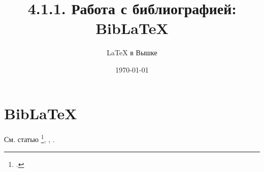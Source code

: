 \documentclass[a4paper,12pt]{article}
\author{\LaTeX{} в Вышке}
\title{4.1.1. Работа с библиографией: Bib\LaTeX}
\date{\today}
\theoremstyle{plain} %
\theoremstyle{definition} %
\theoremstyle{remark} %
\begin{document}

\tableofcontents

\section{Bib\LaTeX}
См. статью \footcite{Fama1965}, \textcite{Spengler2012}, \textcite{Sun2005}.

\nocite{Abbink2012}


\printbibliography
\end{document}
